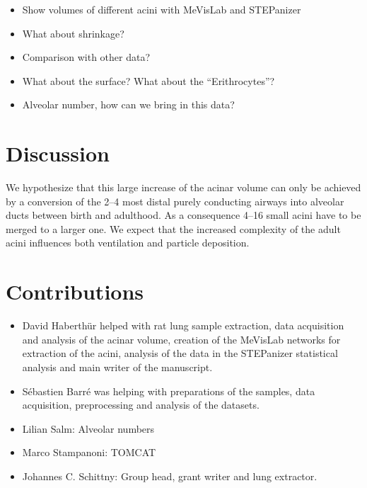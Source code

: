 \documentclass[%
	draft=true,
	paper=a4,%
	twoside=true,%
	abstract=true]{scrartcl}
\begin{document}
\begin{table}
	\centering
	\caption{Summary of the extracted Data. All volumes are given in \si{\micro\litre}}
	\noindent{}
	\label{tab:summary}
\end{table}

\begin{itemize}
	\item Show volumes of different acini with MeVisLab and STEPanizer
	\item What about shrinkage?
	\item Comparison with other data?
	\item What about the surface? What about the “Erithrocytes”?
	\item Alveolar number, how can we bring in this data?
\end{itemize}

\section{Discussion}\label{sec:Discussion}
We hypothesize that this large increase of the acinar volume can only be achieved by a conversion of the \numrange{2}{4} most distal purely conducting airways into alveolar ducts between birth and adulthood. As a consequence \numrange{4}{16} small acini have to be merged to a larger one. We expect that the increased complexity of the adult acini influences both ventilation and particle deposition.

\section{Contributions}
\begin{itemize}
	\item David Haberthür helped with rat lung sample extraction, data acquisition and analysis of the acinar volume, creation of the MeVisLab networks for extraction of the acini, analysis of the data in the STEPanizer statistical analysis and main writer of the manuscript.
	\item Sébastien Barré was helping with preparations of the samples, data acquisition,  preprocessing and analysis of the datasets.
	\item Lilian Salm: Alveolar numbers
	\item Marco Stampanoni: TOMCAT
	\item Johannes C. Schittny: Group head, grant writer and lung extractor.
\end{itemize}
\end{document}
